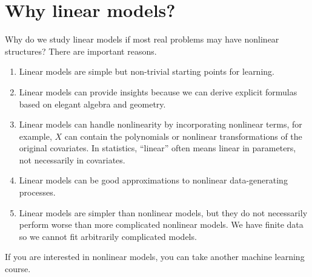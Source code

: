 \section{Why linear models?}

Why do we study linear models if most real problems may have nonlinear structures? There are important reasons. 


\begin{enumerate}[(R1)]
\item Linear models are simple but non-trivial starting points for learning.
\item Linear models can provide insights because we can derive explicit
formulas based on elegant algebra and geometry.
\item Linear models can handle nonlinearity by incorporating nonlinear terms,
for example, $X$ can contain the polynomials or nonlinear transformations
of the original covariates. In statistics, ``linear'' often means linear in parameters, not necessarily in covariates. 
\item Linear models can be good approximations to nonlinear data-generating
processes.
\item Linear models are simpler than nonlinear models, but they do not necessarily
perform worse than more complicated nonlinear models. We have finite data so we cannot fit arbitrarily complicated models. 


\end{enumerate}

If you are interested in nonlinear models, you can take another machine learning course.

 
